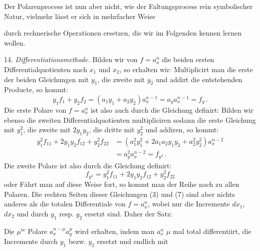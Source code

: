 Der Polarenprocess ist nun aber nicht, wie der Faltungsprocess rein symbolischer Natur, vielmehr lässt er sich in mehrfacher Weise



durch rechnerische Operationen ersetzen, die wir im Folgenden kennen lernen wollen.

14. \textit{Differentiationsmethode.} Bilden wir von $f=a_x^n$ die beiden ersten Differentialquotienten nach $x_1$ und $x_2$, so erhalten wir:
Multiplicirt man die erste der beiden Gleichungen mit $y_1$, die zweite mit $y_2$ und addirt die entstehenden Producte, so kommt:
\[ y_1f_1+y_2f_2 = (a_1y_1+a_2y_2)a_x^{n-1} = a_ya_x^{n-1} = f_y\,. \]
Die erste Polare von $f=a_x^n$ ist also auch durch die Gleichung definirt:
Bilden wir ebenso die zweiten Differentialquotienten
multipliciren sodann die erste Gleichung mit $y_1^2$, die zweite mit $2y_1y_2$, die dritte mit $y_2^2$ und addiren, so kommt:
\[
\begin{aligned}
y_1^2f_{11}+2y_1y_2f_{12}+y_2^2f_{22} &= (a_1^2y_1^2+2a_1a_2y_1y_2+a_2^2y_2^2)a_x^{n-2}\\
&= a_y^2a_x^{n-2} = f_{y^2}\,.
\end{aligned}
\]
Die zweite Polare ist also durch die Gleichung definirt:
\[ f_{y^2} = y_1^2f_{11}+2y_1y_2f_{12}+y_2^2f_{22} \]
oder
Fährt man auf diese Weise fort, so kommt man der Reihe nach zu allen Polaren. Die rechten Seiten dieser Gleichungen (3) und (7) sind aber nichts anderes als die totalen Differentiale von $f=a_x^n$, wobei nur die Incremente $dx_1$, $dx_2$ und durch $y_1$ resp. $y_2$ ersetzt sind. Daher der Satz:

\glqq Die $\mu^{\text{te}}$ Polare $a_x^{n-\mu}a_y^\mu$ wird erhalten, indem man $a_x^n$ $\mu$ mal total differentiirt, die Incremente durch $y_1$ bezw. $y_2$ ersetzt und endlich mit


